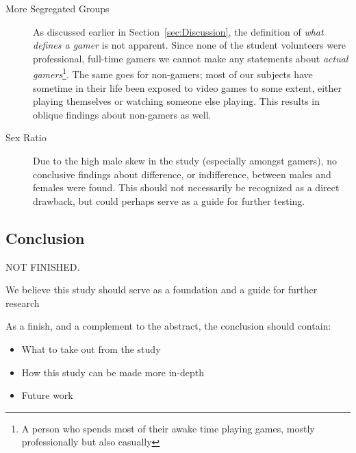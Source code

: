 \documentclass[runningheads,a4paper,oribibl]{llncs}
\begin{document}
\begin{description}
	\item[More Segregated Groups] As discussed earlier in Section~\ref{sec:Discussion}, the definition of \emph{what defines a gamer} is not apparent. Since none of the student volunteers were professional, full-time gamers we cannot make any statements about \emph{actual gamers}\footnote{A person who spends most of their awake time playing games, mostly professionally but also casually}. The same goes for non-gamers; most of our subjects have sometime in their life been exposed to video games to some extent, either playing themselves or watching someone else playing. This results in oblique findings about non-gamers as well.

	\item[Sex Ratio] Due to the high male skew in the study (especially amongst gamers), no conclusive findings about difference, or indifference, between males and females were found. This should not necessarily be recognized as a direct drawback, but could perhaps serve as a guide for further testing.
\end{description}




\subsection{Conclusion}
NOT FINISHED.

We believe this study should serve as a foundation and a guide for further research

As a finish, and a complement to the abstract, the conclusion should contain:
\begin{itemize}
	\item What to take out from the study
	\item How this study can be made more in-depth
	\item Future work
\end{itemize}











\end{document}
